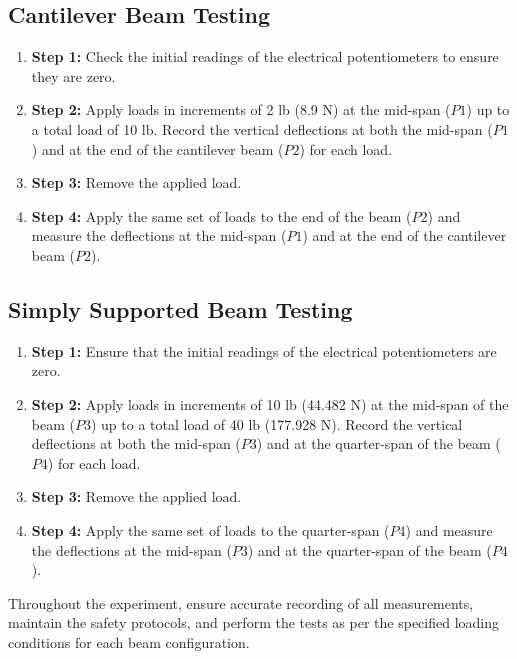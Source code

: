 \documentclass[12pt, titlepage]{article}
\begin{document}
\subsection{Cantilever Beam Testing}
\begin{enumerate}
    \item \textbf{Step 1:} Check the initial readings of the electrical
      potentiometers to ensure they are zero.
    
    \item \textbf{Step 2:} Apply loads in increments of 2 lb (8.9 N) at the
      mid-span (\(P1\)) up to a total load of 10 lb. Record the vertical
      deflections at both the mid-span (\(P1\)) and at the end of the
      cantilever beam (\(P2\)) for each load.
    
    \item \textbf{Step 3:} Remove the applied load.
    
    \item \textbf{Step 4:} Apply the same set of loads to the end of the beam
      (\(P2\)) and measure the deflections at the mid-span (\(P1\)) and at the
      end of the cantilever beam (\(P2\)).
\end{enumerate}

\subsection{Simply Supported Beam Testing}
\begin{enumerate}
    \item \textbf{Step 1:} Ensure that the initial readings of the electrical
      potentiometers are zero.
    
    \item \textbf{Step 2:} Apply loads in increments of 10 lb (44.482 N) at the
      mid-span of the beam (\(P3\)) up to a total load of 40 lb (177.928 N).
      Record the vertical deflections at both the mid-span (\(P3\)) and at the
      quarter-span of the beam (\(P4\)) for each load.
    
    \item \textbf{Step 3:} Remove the applied load.
    
    \item \textbf{Step 4:} Apply the same set of loads to the quarter-span
      (\(P4\)) and measure the deflections at the mid-span (\(P3\)) and at the
      quarter-span of the beam (\(P4\)).
\end{enumerate}
Throughout the experiment, ensure accurate recording of all measurements,
maintain the safety protocols, and perform the tests as per the specified
loading conditions for each beam configuration.
\newpage
\end{document}
